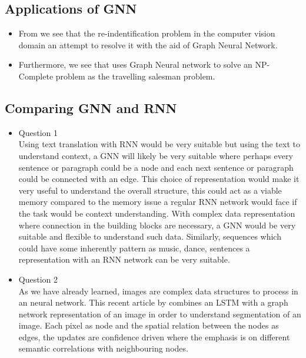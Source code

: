 \documentclass{article}
\begin{document}
\subsection{Applications of GNN}
\begin{itemize}
  \item From \cite{shen2018person} we see that the re-indentification problem in the computer vision domain an attempt to resolve it with the aid of Graph Neural Network.
  \item Furthermore, we see that \cite{prates2019learning} uses Graph Neural network to solve an NP-Complete problem as the travelling salesman problem. 
\end{itemize}


\subsection{Comparing GNN and RNN}
\begin{itemize}
  \item Question 1 \\
  Using text translation with RNN would be very suitable but using the text to understand context, a GNN will likely be very suitable where perhaps every sentence or paragraph could be a node and each next sentence or paragraph could be connected with an edge. This choice of representation would make it very useful to understand the overall structure, this could act as a viable memory compared to the memory issue a regular RNN network would face if the task would be context understanding. With complex data representation where connection in the building blocks are necessary, a GNN would be very suitable and flexible to understand such data. Similarly, sequences which could have some inherently pattern as music, dance, sentences a representation with an RNN network can be very suitable.
  \item Question 2 \\
  As we have already learned, images are complex data structures to process in an neural network. This recent article by \cite{liang2016semantic} combines an LSTM with a graph network representation of an image in order to understand segmentation of an image. Each pixel as node and the spatial relation between the nodes as edges, the updates are confidence driven where the emphasis is on different semantic correlations with neighbouring nodes. 
\end{itemize}
 


\end{document}
